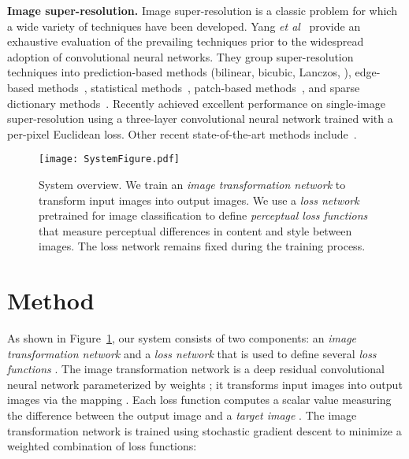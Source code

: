 \documentclass[runningheads]{llncs}
\newcommand{\etal}{\textit{et al}}
\begin{document}
\textbf{Image super-resolution.}
Image super-resolution is a classic problem for which a wide variety of techniques have
been developed. Yang \etal~\cite{yang2014single} provide an exhaustive evaluation of
the prevailing techniques prior to the widespread adoption of convolutional neural networks.
They group super-resolution techniques into prediction-based methods (bilinear, bicubic,
Lanczos, \cite{irani1991improving}), edge-based methods~\cite{freedman2011image,sun2008image},
statistical methods~\cite{shan2008fast,kim2010single,xiong2010robust}, patch-based
methods~\cite{freedman2011image,freeman2002example,chang2004super,glasner2009super,yang2013fast,sun2003image,ni2007image,he2013beta},
and sparse dictionary methods~\cite{yang2008image,yang2010image}.
Recently \cite{dong2015image} achieved excellent performance on single-image
super-resolution using a three-layer convolutional neural network trained with a per-pixel
Euclidean loss. Other recent state-of-the-art methods
include~\cite{timofte2014adjusted,schulter2015fast,huang2015single}.




\begin{figure}[t]
  \centering
  \texttt{[image: SystemFigure.pdf]}
  \vspace{-3mm}
  \caption{System overview. We train an \emph{image transformation network} to transform
    input images into output images. We use a \emph{loss network} pretrained for image
    classification to define \emph{perceptual loss functions} that measure perceptual
    differences in content and style between images. The loss network remains fixed
    during the training process.
  }
  \vspace{-3mm}
  \label{fig:system}
\end{figure}

\section{Method}
\label{sec:method}
As shown in Figure~\ref{fig:system}, our system consists of two components:
an \emph{image transformation network}  and a \emph{loss network}  that
is used to define several \emph{loss functions} . The image
transformation network is a deep residual convolutional neural network parameterized by
weights ; it transforms input images  into output images  via the
mapping . Each loss function computes a scalar value 
measuring the difference between the output image  and a \emph{target image} .
The image transformation network is trained using stochastic gradient descent to minimize
a weighted combination of loss functions:
\end{document}
